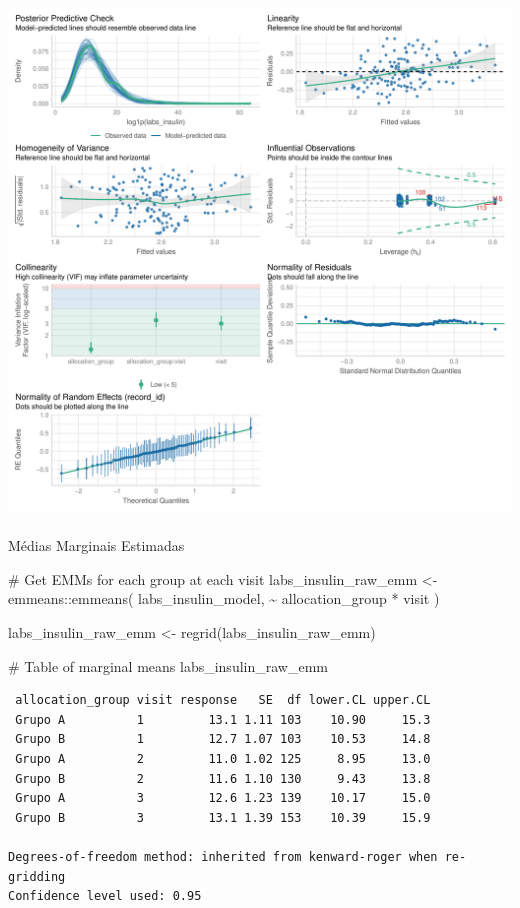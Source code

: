 \documentclass[
  letterpaper,
  DIV=11,
  numbers=noendperiod]{scrartcl}
\makeatletter
\let\oldparagraph\paragraph
\renewcommand{\paragraph}{
    \@ifstar
      \xxxParagraphStar
      \xxxParagraphNoStar
  }
\newcommand{\xxxParagraphStar}[1]{\oldparagraph*{#1}\mbox{}}
\newcommand{\xxxParagraphNoStar}[1]{\oldparagraph{#1}\mbox{}}
\newenvironment{Shaded}{\begin{snugshade}}{\end{snugshade}}
\newcommand{\CommentTok}[1]{\textcolor[rgb]{0.37,0.37,0.37}{#1}}
\newcommand{\FunctionTok}[1]{\textcolor[rgb]{0.28,0.35,0.67}{#1}}
\newcommand{\NormalTok}[1]{\textcolor[rgb]{0.00,0.23,0.31}{#1}}
\newcommand{\OtherTok}[1]{\textcolor[rgb]{0.00,0.23,0.31}{#1}}
\newcommand{\SpecialCharTok}[1]{\textcolor[rgb]{0.37,0.37,0.37}{#1}}
\makeatother
\begin{document}
\includegraphics{Outcomes_V1V2V3_files/figure-pdf/labs_insulin_4-2.pdf}

\paragraph{Médias Marginais
Estimadas}\label{muxe9dias-marginais-estimadas-10}

\begin{Shaded}
\begin{Highlighting}[]
\CommentTok{\# Get EMMs for each group at each visit}
\NormalTok{labs\_insulin\_raw\_emm }\OtherTok{\textless{}{-}}\NormalTok{ emmeans}\SpecialCharTok{::}\FunctionTok{emmeans}\NormalTok{(}
\NormalTok{    labs\_insulin\_model, }
    \SpecialCharTok{\textasciitilde{}}\NormalTok{ allocation\_group }\SpecialCharTok{*}\NormalTok{ visit}
\NormalTok{)}

\NormalTok{labs\_insulin\_raw\_emm }\OtherTok{\textless{}{-}} \FunctionTok{regrid}\NormalTok{(labs\_insulin\_raw\_emm)}

\CommentTok{\# Table of marginal means}
\NormalTok{labs\_insulin\_raw\_emm}
\end{Highlighting}
\end{Shaded}

\begin{verbatim}
 allocation_group visit response   SE  df lower.CL upper.CL
 Grupo A          1         13.1 1.11 103    10.90     15.3
 Grupo B          1         12.7 1.07 103    10.53     14.8
 Grupo A          2         11.0 1.02 125     8.95     13.0
 Grupo B          2         11.6 1.10 130     9.43     13.8
 Grupo A          3         12.6 1.23 139    10.17     15.0
 Grupo B          3         13.1 1.39 153    10.39     15.9

Degrees-of-freedom method: inherited from kenward-roger when re-gridding 
Confidence level used: 0.95 
\end{verbatim}
\end{document}
